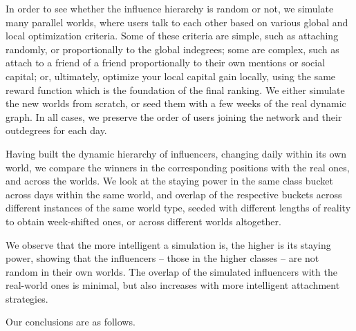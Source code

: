 \documentclass[10pt,oneside]{memoir}
\begin{document}
In order to see whether the influence hierarchy is random or not, we simulate many parallel worlds, where users talk to each other based on various global and local optimization criteria.  Some of these criteria are simple, such as attaching randomly, or proportionally to the global indegrees; some are complex, such as attach to a friend of a friend proportionally to their own mentions or social capital; or, ultimately, optimize your local capital gain locally, using the same reward function which is the foundation of the final ranking.  We either simulate the new worlds from scratch, or seed them with a few weeks of the real dynamic graph.  In all cases, we preserve the order of users joining the network and their outdegrees for each day.


Having built the dynamic hierarchy of influencers, changing daily within its own world, we compare the winners in the corresponding positions with the real ones, and across the worlds.  We look at the staying power in the same class bucket across days within the same world, and overlap of the respective buckets across different instances of the same world type, seeded with different lengths of reality to obtain week-shifted ones, or across different worlds altogether.


We observe that the more intelligent a simulation is, the higher is its staying power, showing that the influencers -- those in the higher classes -- are not random in their own worlds.  The overlap of the simulated influencers with the real-world ones is minimal, but also increases with more intelligent attachment strategies.


Our conclusions are as follows.
\end{document}
